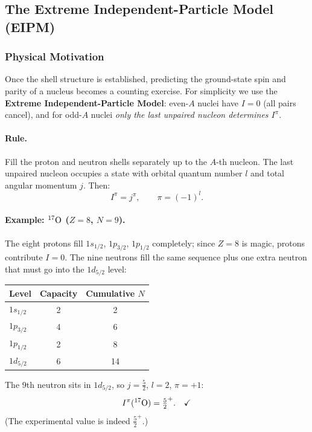 \subsection{The Extreme Independent-Particle Model (EIPM)}

\subsubsection*{Physical Motivation}
Once the shell structure is established, predicting the ground-state spin and
parity of a nucleus becomes a counting exercise.  For simplicity we use the
\textbf{Extreme Independent-Particle Model}: even-$A$ nuclei have $I=0$ (all
pairs cancel), and for odd-$A$ nuclei \emph{only the last unpaired nucleon
determines $I^\pi$}.

\paragraph{Rule.}
Fill the proton and neutron shells separately up to the $A$-th nucleon.  The
last unpaired nucleon occupies a state with orbital quantum number $l$ and
total angular momentum $j$.  Then:
\begin{equation}
  \label{eq:lec04:EIPM}
  \boxed{I^\pi = j^\pi,\qquad \pi=(-1)^l.}
\end{equation}

\paragraph{Example: $\nucleus{O}{17}$ ($Z=8$, $N=9$).}
The eight protons fill $1s_{1/2}$, $1p_{3/2}$, $1p_{1/2}$ completely; since
$Z=8$ is magic, protons contribute $I=0$.  The nine neutrons fill the same
sequence plus one extra neutron that must go into the $1d_{5/2}$ level:
\begin{center}
\begin{tabular}{lcc}
\toprule
Level & Capacity & Cumulative $N$ \\
\midrule
$1s_{1/2}$ & 2 & 2 \\
$1p_{3/2}$ & 4 & 6 \\
$1p_{1/2}$ & 2 & 8 \\
$1d_{5/2}$ & 6 & 14 \\ \bottomrule
\end{tabular}
\end{center}
The 9th neutron sits in $1d_{5/2}$, so $j=\frac{5}{2}$, $l=2$, $\pi=+1$:
\begin{equation}
  I^\pi(\nucleus{O}{17}) = \tfrac{5}{2}^+.\quad \checkmark
\end{equation}
(The experimental value is indeed $\frac{5}{2}^+$.)

